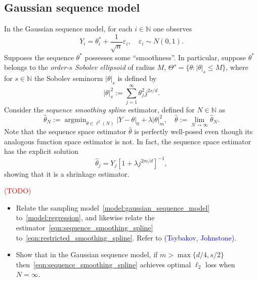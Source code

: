 \documentclass{article}
\newcommand{\1}{\mathbf{1}}
\DeclareMathOperator*{\argmin}{argmin}
\newcommand{\wh}[1]{\widehat{#1}}
\theoremstyle{alden}
\theoremstyle{aldenthm}
\theoremstyle{definition}
\theoremstyle{remark}
\begin{document}
\subsection{Gaussian sequence model}
In the Gaussian sequence model, for each $i \in \mathbb{N}$ one observes
\begin{equation}
\label{model:gaussian_sequence_model}
Y_i = \theta_i^{\ast} + \frac{1}{\sqrt{n}}\varepsilon_i,\quad \varepsilon_i \sim N(0,1).
\end{equation}
Supposes the sequence $\theta^{\ast}$ possesses some ``smoothness''. In particular, suppose $\theta^{\ast}$ belongs to the \emph{order-$s$ Sobolev ellipsoid} of radius $M$, $\Theta^s = \{\theta: |\theta|_s \leq M\}$, where for $s \in \mathbb{N}$ the Sobolev seminorm $|\theta|_s$ is defined by
\begin{equation*}
|\theta|_s^2 := \sum_{j = 1}^{\infty} \theta_j^2 j^{2s/d}.
\end{equation*}
Consider the \emph{sequence smoothing spline} estimator, defined for $N \in \mathbb{N}$ as
\begin{equation}
\label{eqn:sequence_smoothing_spline}
\wh{\theta}_{N} := \argmin_{\theta \in \ell^2(N)} |Y - \theta|_{0} + \lambda |\theta|_m^2, \quad \wh{\theta} := \lim_{N \to \infty} \wh{\theta}_{N}.
\end{equation}
Note that the sequence space estimator $\wh{\theta}$ is perfectly well-posed even though its analogous function space estimator is not. In fact, the sequence space estimator has the explicit solution
\begin{equation}
\wh{\theta}_{j} = Y_j[1 + \lambda j^{2m/d}]^{-1},
\end{equation}
showing that it is a shrinkage estimator.

\textcolor{red}{(TODO)}
\begin{itemize}
	\item Relate the sampling model~\eqref{model:gaussian_sequence_model} to~\eqref{model:regression}, and likewise relate the estimator~\eqref{eqn:sequence_smoothing_spline} to~\eqref{eqn:restricted_smoothing_spline}. Refer to \textcolor{blue}{(Tsybakov, Johnstone)}.
	\item Show that in the Gaussian sequence model, if $m > \max\{d/4,s/2\}$ then~\eqref{eqn:sequence_smoothing_spline} achieves optimal $\ell_2$ loss when $N = \infty$.
\end{itemize}
\end{document}
